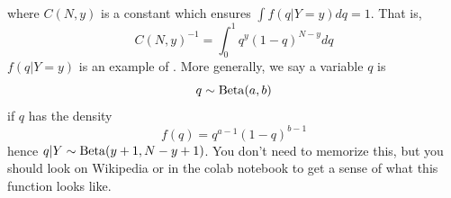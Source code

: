 where $C(N,y)$ is a constant which ensures $\int f(q|Y=y)dq = 1$. That is, 
\begin{equation}
C(N,y)^{-1} = \int_0^1 q^y(1-q)^{N-y} dq
\end{equation} 
$f(q|Y=y)$ is an example of . More generally, we say a variable $q$ is
\begin{equation}
q \sim {\rm Beta}(a,b)
\end{equation}
if $q$ has the density 
\begin{equation}
f(q) = q^{a-1}(1-q)^{b-1}
\end{equation}
hence $q|Y \sim {\rm Beta}(y+1,N-y+1)$. 
 You don't need to memorize this, but you should look on Wikipedia or in the colab notebook to get a sense of what this function looks like. 




